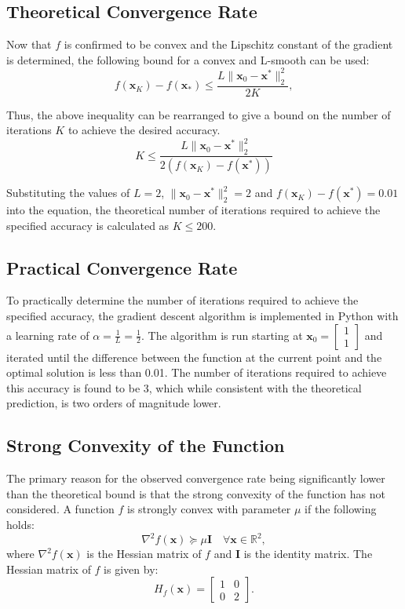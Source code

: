 \documentclass[11pt]{article}
\begin{document}
\subsection{Theoretical Convergence Rate}
Now that \(f\) is confirmed to be convex and the Lipschitz constant of the gradient is determined, the following bound for a convex and L-smooth can be used:
$$
    f(\mathbf{x}_K) - f(\mathbf{x}_*) \leq \frac{L \|\mathbf{x}_0 - \mathbf{x}^*\|_2^2}{2K},
$$

Thus, the above inequality can be rearranged to give a bound on the number of iterations $K$ to achieve the desired accuracy. 
\[
K \leq \frac{L \|\mathbf{x}_0 - \mathbf{x}^*\|_2^2}{2(f(\mathbf{x}_K) - f(\mathbf{x}^*))}
\]

Substituting the values of \( L = 2 \), \( \|\mathbf{x}_0 - \mathbf{x}^*\|^2_2 = 2 \) and \(f(\mathbf{x}_K) - f(\mathbf{x}^*) = 0.01 \) into the equation, the theoretical number of iterations required to achieve the specified accuracy is calculated as \( K \leq 200 \).

\subsection{Practical Convergence Rate}
To practically determine the number of iterations required to achieve the specified accuracy, the gradient descent algorithm is implemented in Python with a learning rate of \( \alpha = \frac{1}{L} = \frac{1}{2} \). The algorithm is run starting at 
\( \mathbf{x}_0 = \begin{bmatrix} 1 \\ 1 \end{bmatrix} \) and iterated until the difference between the function at the current point and the optimal solution is less than 0.01. The number of iterations required to achieve this accuracy is found to be 3, which while consistent with the theoretical prediction, is two orders of magnitude lower.

\subsection{Strong Convexity of the Function}
The primary reason for the observed convergence rate being significantly lower than the theoretical bound is that the strong convexity of the function has not considered. A function \( f \) is strongly convex with parameter \( \mu \) if the following holds:
\[
\nabla^2 f(\mathbf{x}) \succeq \mu \mathbf{I} \quad \forall \mathbf{x} \in \mathbb{R}^2,
\]
where \( \nabla^2 f(\mathbf{x}) \) is the Hessian matrix of \( f \) and \( \mathbf{I} \) is the identity matrix. The Hessian matrix of \( f \) is given by:
\[
H_f(\mathbf{x}) = \begin{bmatrix} 1 & 0 \\ 0 & 2 \end{bmatrix}.
\]
\end{document}
